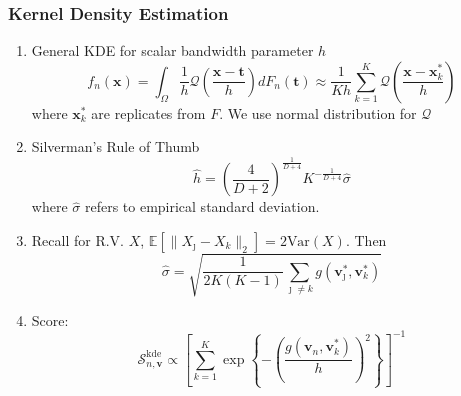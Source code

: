 \documentclass[aspectratio=169,10pt,notes]{beamer}
\begin{document}

\begin{frame}
    \frametitle{Kernel Density Estimation}
    {\footnotesize
    \begin{enumerate}
        \item General KDE for scalar bandwidth parameter $h$
        \[
        f_n(\bm{x}) = \int_{\Omega}\frac{1}{h}\mathcal{Q}\left(\frac{\bm{x} 
                - \bm{t}}{h}\right)dF_n(\bm{t})
            \approx \frac{1}{Kh}\sum_{k = 1}^K\mathcal{Q}\left(\frac{\bm{x} 
                - \bm{x}_k^*}{h}\right)
        \]
        where $\bm{x}_k^*$ are replicates from $F$.  We use normal distribution 
            for $\mathcal{Q}$
        \item Silverman's Rule of Thumb
        \[
            \hat{h} = \left(\frac{4}{D + 2}\right)^{
                \frac{1}{D + 4}}K^{-\frac{1}{D+4}}
                \hat{\sigma}
        \]
        where $\hat{\sigma}$ refers to empirical standard deviation.
        \item Recall for R.V. $X$, 
            $\mathbb{E}\left[\lVert X_{\jmath} - X_k\rVert_2\right] = 2\text{Var}(X)$.  
            Then
        \[
            \hat{\sigma} = 
                \sqrt{\frac{1}{2K(K-1)}\sum_{\jmath \neq k}
                    g\left(\bm{v}_{\jmath}^*,\bm{v}_k^*\right)}
        \]
        \item Score:
        \[
        \mathcal{S}_{n,\bm{v}}^{\text{kde}} \propto 
            \left[\sum_{k=1}^K\exp\left\lbrace-\left(
                \frac{g(\bm{v}_n,\bm{v}_k^*)}{h}\right)^2\right\rbrace\right]^{-1}
        \]
    \end{enumerate}
    }
\end{frame} %
\end{document}
